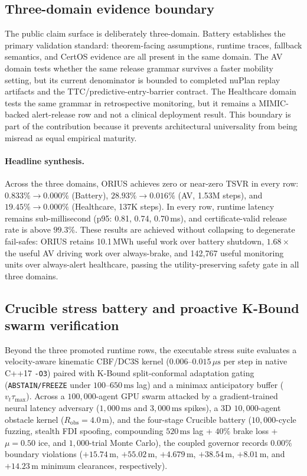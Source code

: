 \subsection{Three-domain evidence boundary}
The public claim surface is deliberately three-domain. Battery establishes the primary
validation standard: theorem-facing assumptions, runtime traces, fallback semantics, and
CertOS evidence are all present in the same domain. The AV domain tests whether the same release
grammar survives a faster mobility setting, but its current denominator is bounded to
completed nuPlan replay artifacts and the TTC/predictive-entry-barrier contract. The
Healthcare domain tests the same grammar in retrospective monitoring, but it remains a
MIMIC-backed alert-release row and not a clinical deployment result. This boundary is
part of the contribution because it prevents architectural universality from being
misread as equal empirical maturity.

\paragraph{Headline synthesis.}
Across the three domains, ORIUS achieves zero or near-zero TSVR in every row:
$0.833\% \to 0.000\%$ (Battery), $28.93\% \to 0.016\%$ (AV, 1.53M steps),
and $19.45\% \to 0.000\%$ (Healthcare, 137K steps).
In every row, runtime latency remains sub-millisecond (p95: 0.81, 0.74, 0.70\,ms),
and certificate-valid release rate is above $99.3\%$.
These results are achieved without collapsing to degenerate fail-safes: ORIUS
retains 10.1\,MWh useful work over battery shutdown, $1.68\times$ the useful AV
driving work over always-brake, and 142,767 useful monitoring units over
always-alert healthcare, passing the utility-preserving safety gate in all three domains.

\subsection{Crucible stress battery and proactive K-Bound swarm verification}
Beyond the three promoted runtime rows, the executable stress suite evaluates a velocity-aware kinematic CBF/DC3S kernel ($0.006\text{--}0.015\,\mu\text{s}$ per step in native C++17 \texttt{-O3}) paired with K-Bound split-conformal adaptation gating (\texttt{ABSTAIN/FREEZE} under $100\text{--}650\,\text{ms}$ lag) and a minimax anticipatory buffer ($v_t \tau_{\max}$). Across a $100,000$-agent GPU swarm attacked by a gradient-trained neural latency adversary ($1,000\,\text{ms}$ and $3,000\,\text{ms}$ spikes), a 3D $10,000$-agent obstacle kernel ($R_{\mathrm{obs}}=4.0\,\text{m}$), and the four-stage Crucible battery ($10,000$-cycle fuzzing, stealth FDI spoofing, compounding $520\,\text{ms}$ lag + $40\%$ brake loss + $\mu=0.50$ ice, and $1,000$-trial Monte Carlo), the coupled governor records $0.00\%$ boundary violations ($+15.74\,\text{m}$, $+55.02\,\text{m}$, $+4.679\,\text{m}$, $+38.54\,\text{m}$, $+8.01\,\text{m}$, and $+14.23\,\text{m}$ minimum clearances, respectively).

